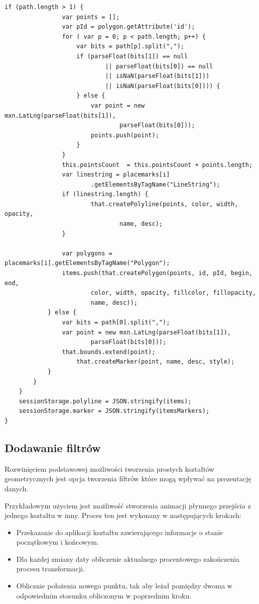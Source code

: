 \begin{lstlisting}[label={lst:minconf},caption={Parser plików.}]
			if (path.length > 1) {
				var points = [];
				var pId = polygon.getAttribute('id');
				for ( var p = 0; p < path.length; p++) {
					var bits = path[p].split(",");
					if (parseFloat(bits[1]) == null
							|| parseFloat(bits[0]) == null
							|| isNaN(parseFloat(bits[1]))
							|| isNaN(parseFloat(bits[0]))) {
					} else {
						var point = new mxn.LatLng(parseFloat(bits[1]),
								parseFloat(bits[0]));
						points.push(point);
					}
				}
				this.pointsCount  = this.pointsCount + points.length;
				var linestring = placemarks[i]
						.getElementsByTagName("LineString");
				if (linestring.length) {
						that.createPolyline(points, color, width, opacity,
								name, desc);
				}

				var polygons = placemarks[i].getElementsByTagName("Polygon");
				items.push(that.createPolygon(points, id, pId, begin, end,
						color, width, opacity, fillcolor, fillopacity,
						name, desc));
			} else {
				var bits = path[0].split(",");
				var point = new mxn.LatLng(parseFloat(bits[1]),
						parseFloat(bits[0]));
				that.bounds.extend(point);
					that.createMarker(point, name, desc, style);
			}
		}
	}
	sessionStorage.polyline = JSON.stringify(items);
	sessionStorage.marker = JSON.stringify(itemsMarkers);
}

\end{lstlisting}

\subsection{Dodawanie filtrów}
\label{subsec:filters}

Rozwinięciem podstawowej możliwości tworzenia prostych kształtów geometrycznych jest opcja tworzenia filtrów które mogą wpływać na prezentację danych.

Przykładowym użyciem jest możliwość stworzenia animacji płynnego przejścia z jednego kształtu w inny. Proces ten jest wykonany w następujących krokach:

\begin{itemize}
\item
Przekazanie do aplikacji kształtu zawierającego informacje o stanie początkowym i końcowym.
\item
Dla każdej zmiany daty obliczenie aktualnego procentowego zakończenia procesu transformacji.
\item
Oblicznie położenia nowego punktu, tak aby leżał pomiędzy dwoma w odpowiednim stosunku obliczonym w poprzednim kroku.
\end{itemize}

